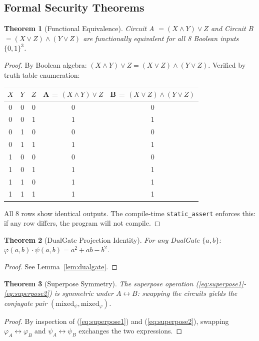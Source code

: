 \documentclass[11pt,a4paper]{article}
\newtheorem{theorem}{Theorem}[section]
\begin{document}
\subsection{Formal Security Theorems}

\begin{theorem}[Functional Equivalence]\label{thm:func}
Circuit A $= (X \land Y) \lor Z$ and Circuit B $= (X \lor Z) \land (Y \lor Z)$ are functionally equivalent for all 8 Boolean inputs $\{0,1\}^3$.
\end{theorem}

\begin{proof}
By Boolean algebra: $(X \land Y) \lor Z = (X \lor Z) \land (Y \lor Z)$. Verified by truth table enumeration:
\begin{center}
\begin{tabular}{ccc|c|c}
$X$ & $Y$ & $Z$ & A = $(X \land Y) \lor Z$ & B = $(X \lor Z) \land (Y \lor Z)$ \\
\hline
0 & 0 & 0 & 0 & 0 \\
0 & 0 & 1 & 1 & 1 \\
0 & 1 & 0 & 0 & 0 \\
0 & 1 & 1 & 1 & 1 \\
1 & 0 & 0 & 0 & 0 \\
1 & 0 & 1 & 1 & 1 \\
1 & 1 & 0 & 1 & 1 \\
1 & 1 & 1 & 1 & 1
\end{tabular}
\end{center}
All 8 rows show identical outputs. The compile-time \texttt{static\_assert} enforces this: if any row differs, the program will not compile.
\end{proof}

\begin{theorem}[DualGate Projection Identity]\label{thm:dualgate}
For any DualGate $\{a,b\}$: $\varphi(a,b) \cdot \psi(a,b) = a^2 + ab - b^2$.
\end{theorem}
\begin{proof} See Lemma~\ref{lem:dualgate}. \end{proof}

\begin{theorem}[Superpose Symmetry]\label{thm:superpose}
The superpose operation (\ref{eq:superpose1}-\ref{eq:superpose2}) is symmetric under $A \leftrightarrow B$: swapping the circuits yields the conjugate pair $(\text{mixed}_\psi, \text{mixed}_\varphi)$.
\end{theorem}
\begin{proof}
By inspection of (\ref{eq:superpose1}) and (\ref{eq:superpose2}), swapping $\varphi_A \leftrightarrow \varphi_B$ and $\psi_A \leftrightarrow \psi_B$ exchanges the two expressions.
\end{proof}
\end{document}
